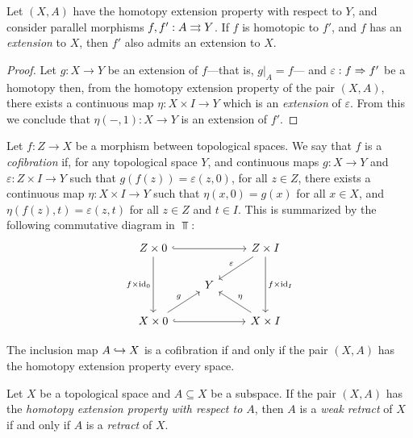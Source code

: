 \begin{corollary}
\label{cor:homotopic-extension-property}
Let \((X, A)\) have the homotopy extension property with respect to \(Y\), and
consider parallel morphisms \(f, f': A \rightrightarrows Y\). If \(f\) is homotopic to
\(f'\), and \(f\) has an \emph{extension} to \(X\), then \(f'\) also admits an
extension to \(X\).
\end{corollary}

\begin{proof}
Let \(g: X \to Y\) be an extension of \(f\)---that is, \(g|_A = f\)--- and
\(\varepsilon: f \Rightarrow f'\) be a homotopy then, from the homotopy extension
property of the pair \((X, A)\), there exists a continuous map
\(\eta: X \times I \to Y\) which is an \emph{extension} of
\(\varepsilon\). From this we conclude that \(\eta(-, 1): X \to Y\) is an
extension of \(f'\).
\end{proof}

\begin{definition}[Cofibration]
\label{def:cofibration}
Let \(f: Z \to X\) be a morphism between topological spaces. We say that \(f\)
is a \emph{cofibration} if, for any topological space \(Y\), and continuous maps
\(g: X \to Y\) and \(\varepsilon: Z \times I \to Y\) such that
\(g(f(z)) = \varepsilon(z, 0)\), for all \(z \in Z\), there exists a continuous
map \(\eta: X \times I \to Y\) such that \(\eta(x, 0) = g(x)\) for all
\(x \in X\), and \(\eta(f(z), t) = \varepsilon(z, t)\) for all \(z \in Z\) and
\(t \in I\). This is summarized by the following commutative diagram in
\(\Top\):
\[
\begin{tikzcd}
Z \times 0 \ar[rr, hook] \ar[dd, "f \times \Id_0"']
& &Z \times I \ar[dd, "f \times \Id_I"] \ar[ld, "\varepsilon"'] \\
&Y & \\
X \times 0 \ar[rr, hook] \ar[ru, "g"]
& &X \times I \ar[lu, "\eta"']
\end{tikzcd}
\]
\end{definition}

\begin{example}
\label{exp:inclusion-cofibration}
The inclusion map \(A \hookrightarrow X\) is a cofibration if and only if the pair
\((X, A)\) has the homotopy extension property every space.
\end{example}

\begin{theorem}
\label{thm:weak-retract-iff-retract}
Let \(X\) be a topological space and \(A \subseteq X\) be a subspace. If the
pair \((X, A)\) has the \emph{homotopy extension property with respect to
  \(A\)}, then \(A\) is a \emph{weak retract} of \(X\) if and only if \(A\) is a
\emph{retract} of \(X\).
\end{theorem}

